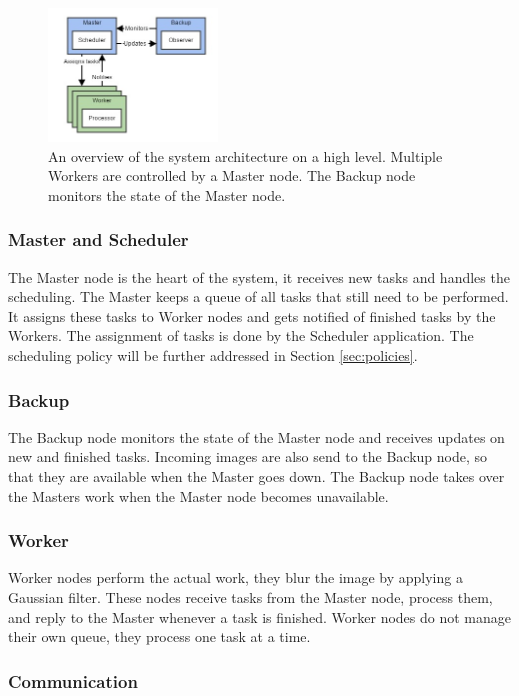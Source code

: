 \documentclass{acm_proc_article-sp}
\begin{document}
\begin{figure}[]
	\centering
	\includegraphics[width=0.4\textwidth]{images/architecture_overview.jpg}
	\caption{An overview of the system architecture on a high level. Multiple Workers are controlled by a Master node. The Backup node monitors the state of the Master node.}
	\label{fig:architecture_overview}
\end{figure}

\subsubsection{Master and Scheduler}
The Master node is the heart of the system, it receives new tasks and handles the scheduling.
The Master keeps a queue of all tasks that still need to be performed.
It assigns these tasks to Worker nodes and gets notified of finished tasks by the Workers.
The assignment of tasks is done by the Scheduler application.
The scheduling policy will be further addressed in Section \ref{sec:policies}.

\subsubsection{Backup}
The Backup node monitors the state of the Master node and receives updates on new and finished tasks.
Incoming images are also send to the Backup node, so that they are available when the Master goes down.
The Backup node takes over the Masters work when the Master node becomes unavailable.

\subsubsection{Worker}
Worker nodes perform the actual work, they blur the image by applying a Gaussian filter.
These nodes receive tasks from the Master node, process them, and reply to the Master whenever a task is finished.
Worker nodes do not manage their own queue, they process one task at a time.

\subsubsection{Communication}
\end{document}
